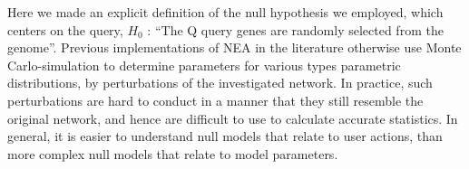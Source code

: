 \documentclass[a4paper,american]{lipics-v2016}
\begin{document}
Here we made an explicit definition of the null hypothesis we employed, which centers on the query, $H_0$ : ``The Q query genes are randomly selected from the genome''. Previous implementations of NEA in the literature otherwise use Monte Carlo-simulation to determine parameters for various types parametric distributions, by perturbations of the investigated network. In practice, such perturbations are hard to conduct in a manner that they still resemble the original network, and hence are difficult to use to calculate accurate statistics. In general, it is easier to understand null models that relate to user actions, than more complex null models that relate to model parameters.


\end{document}
